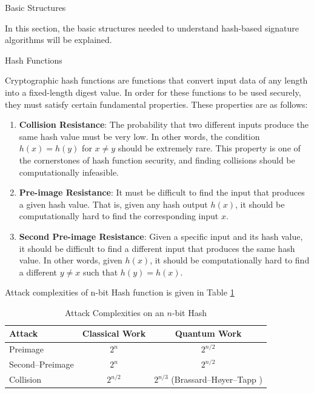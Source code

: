 \documentclass [version=submission]{iacrcc}
\begin{document}
\begin{section}{Basic Structures}{\label{sec1}}

In this section, the basic structures needed to understand hash-based signature algorithms will be explained.


\begin{subsection}{Hash Functions}

    Cryptographic hash functions are functions that convert input data of any length into a fixed-length digest value. In order for these functions to be used securely, they must satisfy certain fundamental properties. These properties are as follows:

    \begin{enumerate}[label=\textbf{\arabic*.}]
    \item \textbf{Collision Resistance}: The probability that two different inputs produce the same hash value must be very low. In other words, the condition \( h(x) = h(y) \) for \( x \neq y \) should be extremely rare. This property is one of the cornerstones of hash function security, and finding collisions should be computationally infeasible.

    \item \textbf{Pre-image Resistance}: It must be difficult to find the input that produces a given hash value. That is, given any hash output \( h(x) \), it should be computationally hard to find the corresponding input \( x \).

    \item \textbf{Second Pre-image Resistance}: Given a specific input and its hash value, it should be difficult to find a different input that produces the same hash value. In other words, given \( h(x) \), it should be computationally hard to find a different \( y \neq x \) such that \( h(y) = h(x) \).
    
    \end{enumerate}

Attack complexities of n-bit Hash function is given in Table \ref{tab:hash-complexities}

\begin{table}[h!]
  \centering
  \caption{Attack Complexities on an \(n\)‐bit Hash}
  \label{tab:hash-complexities}
  \begin{tabular}{|l|c|c|}
    \hline
    \textbf{Attack}            & \textbf{Classical Work} & \textbf{Quantum Work} \\ \hline
    Preimage                   & \(2^n\)                 & \(2^{n/2}\)           \\ \hline
    Second–Preimage            & \(2^n\)                 & \(2^{n/2}\)           \\ \hline
    Collision                  & \(2^{n/2}\)             & \(2^{n/3}\) (Brassard–Høyer–Tapp \cite{Brassard_1998}) \\ \hline
  \end{tabular}
\end{table}


\end{subsection}
\end{section}
\end{document}
